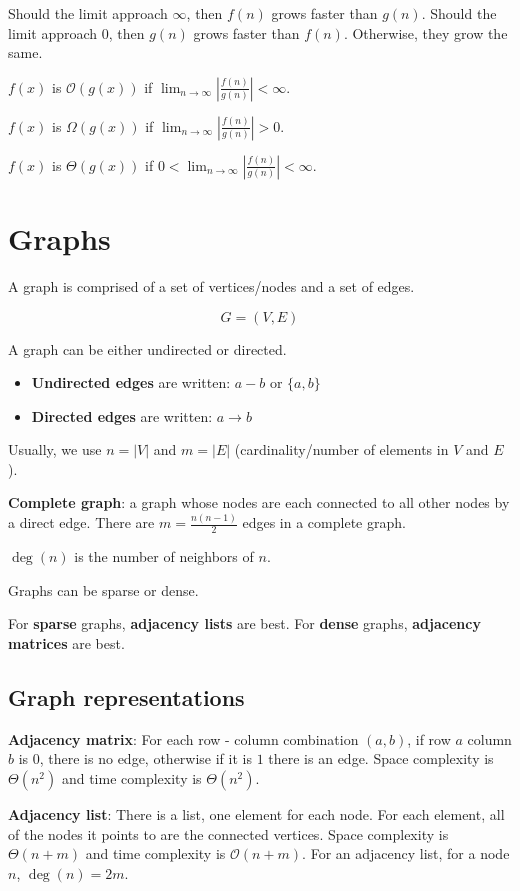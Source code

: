 \documentclass{article}
\newcommand{\Oh}{\mathcal{O}}
\begin{document}
Should the limit approach $\infty$, then $f(n)$ grows faster than $g(n)$. Should the limit approach $0$, then $g(n)$ grows faster than $f(n)$. Otherwise, they grow the same.

$f(x)$ is $\Oh(g(x))$ if $\lim_{n \to \infty} |\frac{f(n)}{g(n)}| < \infty$.

$f(x)$ is $\Omega(g(x))$ if $\lim_{n \to \infty} |\frac{f(n)}{g(n)}| > 0$.

$f(x)$ is $\Theta(g(x))$ if $0 < \lim_{n \to \infty} |\frac{f(n)}{g(n)}| < \infty$.

\section{Graphs}

A graph is comprised of a set of vertices/nodes and a set of edges.

$$G = (V, E)$$

A graph can be either undirected or directed.

\begin{itemize}
    \item \textbf{Undirected edges} are written: $a-b$ or $\{a, b\}$
    \item \textbf{Directed edges} are written: $a \rightarrow b$
\end{itemize}

Usually, we use $n = |V|$ and $m = |E|$ (cardinality/number of elements in $V$ and $E$).

\textbf{Complete graph}: a graph whose nodes are each connected to all other nodes by a direct edge. There are $m = \frac{n(n-1)}{2}$ edges in a complete graph.

$\deg(n)$ is the number of neighbors of $n$.

Graphs can be sparse or dense.

For \textbf{sparse} graphs, \textbf{adjacency lists} are best. For \textbf{dense} graphs, \textbf{adjacency matrices} are best.

\subsection{Graph representations}

\textbf{Adjacency matrix}: For each row - column combination $(a, b)$, if row $a$ column $b$ is 0, there is no edge, otherwise if it is $1$ there is an edge. Space complexity is $\Theta(n^2)$ and time complexity is $\Theta(n^2)$.

\textbf{Adjacency list}: There is a list, one element for each node. For each element, all of the nodes it points to are the connected vertices. Space complexity is $\Theta(n + m)$ and time complexity is $\Oh(n + m)$. For an adjacency list, for a node $n$, $\deg(n) = 2m$.
\end{document}
